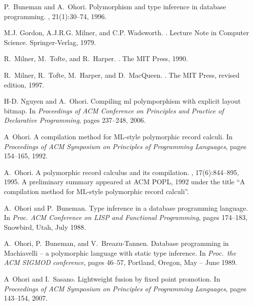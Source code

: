 \documentclass{jbook}
\begin{document}
% 
% 
\begin{thebibliography}{10}

P.~Buneman and A.~Ohori.
\newblock Polymorphism and type inference in database programming.
, 21(1):30--74, 1996.

M.J. Gordon, A.J.R.G. Milner, and C.P. Wadsworth.
.
\newblock Lecture Note in Computer Science. Springer-Verlag, 1979.

R.~Milner, M.~Tofte, and R.~Harper.
.
\newblock The MIT Press, 1990.

R.~Milner, R.~Tofte, M.~Harper, and D.~MacQueen.
.
\newblock The MIT Press, revised edition, 1997.

H-D. Nguyen and A.~Ohori.
\newblock Compiling ml polymporphism with explicit layout bitmap.
\newblock In {\em Proceedings of ACM Conference on Principles and Practice of
  Declarative Programming}, pages 237--248, 2006.

A~Ohori.
\newblock A compilation method for {ML}-style polymorphic record calculi.
\newblock In {\em Proceedings of ACM Symposium on Principles of Programming
  Languages}, pages 154--165, 1992.

A.~Ohori.
\newblock A polymorphic record calculus and its compilation.
,
  17(6):844--895, 1995.
\newblock A preliminary summary appeared at ACM POPL, 1992 under the title ``A
  compilation method for ML-style polymorphic record calculi''.

A.~Ohori and P.~Buneman.
\newblock Type inference in a database programming language.
\newblock In {\em Proc. ACM Conference on LISP and Functional Programming},
  pages 174--183, Snowbird, Utah, July 1988.

A.~Ohori, P.~Buneman, and V.~Breazu-Tannen.
\newblock Database programming in {Machiavelli} -- a polymorphic language with
  static type inference.
\newblock In {\em Proc.\ the ACM SIGMOD conference}, pages 46--57, Portland,
  Oregon, May -- June 1989.

A~Ohori and I.~Sasano.
\newblock Lightweight fusion by fixed point promotion.
\newblock In {\em Proceedings of ACM Symposium on Principles of Programming
  Languages}, pages 143--154, 2007.


\end{thebibliography}
\end{document}
